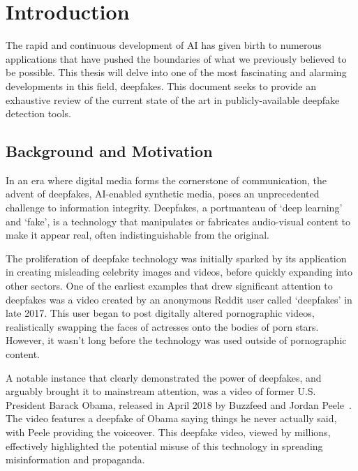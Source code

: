 
\chapter{Introduction}\label{chapter:introduction}
The rapid and continuous development of \ac{AI} has given birth to numerous
applications that have pushed the boundaries of what we previously believed to be possible.
This thesis will delve into one of the most fascinating and alarming developments in this
field, deepfakes. This document seeks to provide an exhaustive review of the current state
of the art in publicly-available deepfake detection tools.



\section{Background and Motivation}\label{chapter:backgroundAndMotivation}
In an era where digital media forms the cornerstone of communication, the advent of deepfakes,
\ac{AI}-enabled synthetic media, poses an unprecedented challenge to information integrity.
Deepfakes, a portmanteau of `deep learning' and `fake', is a technology that manipulates or
fabricates audio-visual content to make it appear real, often indistinguishable from the original.

The proliferation of deepfake technology was initially sparked by its application in creating
misleading celebrity images and videos, before quickly expanding into other sectors. One of the
earliest examples that drew significant attention to deepfakes was a video created by an anonymous
Reddit user called `deepfakes' in late 2017. This user began to post digitally altered pornographic
videos, realistically swapping the faces of actresses onto the bodies of porn stars. However, it
wasn't long before the technology was used outside of pornographic content.

A notable instance that clearly demonstrated the power of deepfakes, and arguably brought it to
mainstream attention, was a video of former U.S. President Barack Obama, released in April 2018
by Buzzfeed and Jordan Peele~\cite{peele,10.1145/3371409}. The video features a deepfake of Obama 
saying things he never actually said, with Peele providing the voiceover. This deepfake video, 
viewed by millions, effectively highlighted the potential misuse of this technology in spreading 
misinformation and propaganda.

